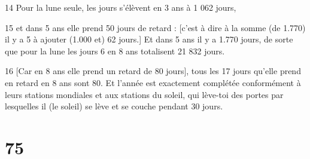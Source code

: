 \par 14 Pour la lune seule, les jours s'élèvent en 3 ans à 1 062 jours,
\par 15 et dans 5 ans elle prend 50 jours de retard : [c'est à dire à la somme (de 1.770) il y a 5 à ajouter (1.000 et) 62 jours.] Et dans 5 ans il y a 1.770 jours, de sorte que pour la lune les jours 6 en 8 ans totalisent 21 832 jours.
\par 16 [Car en 8 ans elle prend un retard de 80 jours], tous les 17 jours qu'elle prend en retard en 8 ans sont 80. Et l'année est exactement complétée conformément à leurs stations mondiales et aux stations du soleil, qui lève-toi des portes par lesquelles il (le soleil) se lève et se couche pendant 30 jours.

\chapter{75}

